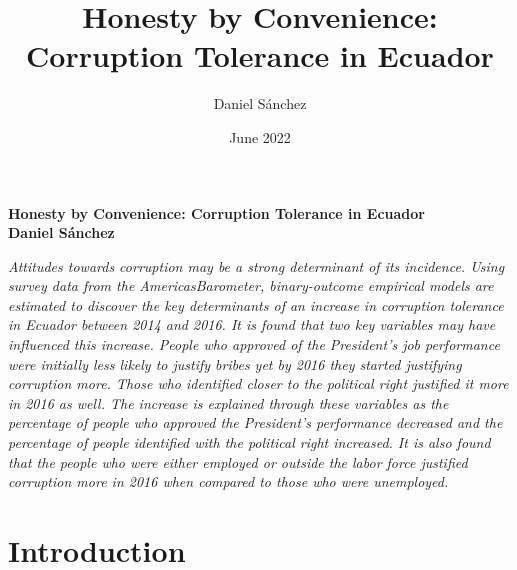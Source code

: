 \documentclass[12pt,a4]{article}\usepackage[]{graphicx}\usepackage[]{xcolor}
\title{Honesty by Convenience: Corruption Tolerance in Ecuador}
\author{Daniel Sánchez}
\date{June 2022}
\begin{document}





\begin{center}
\textbf{
Honesty by Convenience: Corruption Tolerance in Ecuador\\
Daniel Sánchez}
\end{center}

\textit{
Attitudes towards corruption may be a strong determinant of its incidence. Using survey
data from the AmericasBarometer, binary-outcome empirical models are estimated to discover
the key determinants of an increase in corruption tolerance in Ecuador between 2014 and
2016. It is found that two key variables may have influenced this increase. People who approved
of the President’s job performance were initially less likely to justify bribes yet by 2016 they started justifying corruption more. Those who identified closer to the political right justified it more in 2016 as well. The increase is explained through these variables as the percentage of people who approved the President's performance decreased and the percentage of people identified with the political right increased. It is also found that the people who were either employed or outside the labor force justified corruption more in 2016 when compared to those who were unemployed.}




\section{Introduction}


\end{document}
